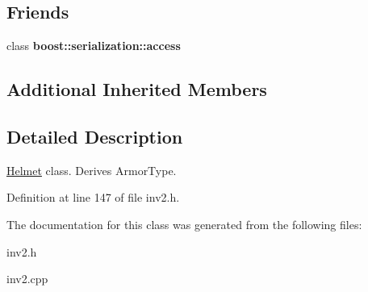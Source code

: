 \subsection*{Friends}
\begin{DoxyCompactItemize}
\item 
\hypertarget{class_helmet_ac98d07dd8f7b70e16ccb9a01abf56b9c}{}\label{class_helmet_ac98d07dd8f7b70e16ccb9a01abf56b9c} 
class {\bfseries boost\+::serialization\+::access}
\end{DoxyCompactItemize}
\subsection*{Additional Inherited Members}


\subsection{Detailed Description}
\hyperlink{class_helmet}{Helmet} class. Derives Armor\+Type. 

Definition at line 147 of file inv2.\+h.



The documentation for this class was generated from the following files\+:\begin{DoxyCompactItemize}
\item 
inv2.\+h\item 
inv2.\+cpp\end{DoxyCompactItemize}
